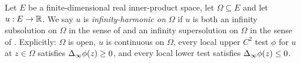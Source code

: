 \begin{definition}
Let $E$ be a finite-dimensional real inner-product space, let $\Omega\subseteq E$
and let $u:E\to\mathbb{R}$. We say $u$ is \emph{infinity-harmonic on $\Omega$} if $u$ is
both an infinity subsolution on $\Omega$ in the sense of
 and an infinity supersolution on $\Omega$ in the
sense of . Explicitly: $\Omega$ is open, $u$ is
continuous on $\Omega$, every local upper $C^2$ test $\phi$ for $u$ at
$z\in\Omega$ satisfies $\Delta_{\infty}\phi(z)\ge0$, and every local lower test satisfies
$\Delta_{\infty}\phi(z)\le0$.
\end{definition}
